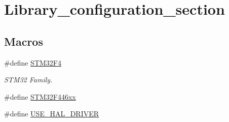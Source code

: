 \hypertarget{group___library__configuration__section}{}\section{Library\+\_\+configuration\+\_\+section}
\label{group___library__configuration__section}
\subsection*{Macros}
\begin{DoxyCompactItemize}
\item 
\#define \hyperlink{group___library__configuration__section_ga84d985cb5667176091597f71ffdb9307}{S\+T\+M32\+F4}\hypertarget{group___library__configuration__section_ga84d985cb5667176091597f71ffdb9307}{}\label{group___library__configuration__section_ga84d985cb5667176091597f71ffdb9307}

\begin{DoxyCompactList}\small\item\em S\+T\+M32 Family. \end{DoxyCompactList}\item 
\#define \hyperlink{group___library__configuration__section_ga89c3f6e33fc5056c1c5c4b09463458da}{S\+T\+M32\+F446xx}
\item 
\#define \hyperlink{group___library__configuration__section_ga13fde7eed89250511adafbc8bbedcc62}{U\+S\+E\+\_\+\+H\+A\+L\+\_\+\+D\+R\+I\+V\+ER}\hypertarget{group___library__configuration__section_ga13fde7eed89250511adafbc8bbedcc62}{}\label{group___library__configuration__section_ga13fde7eed89250511adafbc8bbedcc62}


\end{DoxyCompactItemize}

